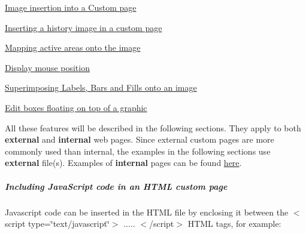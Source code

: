 \begin{DoxyItemize}
\item \hyperlink{RC_mhttpd_Image_access_RC_mhttpd_custom_image}{Image insertion into a Custom page}
\begin{DoxyItemize}
\item \hyperlink{RC_mhttpd_Image_access_RC_mhttpd_custom_history}{Inserting a history image in a custom page}
\item \hyperlink{RC_mhttpd_Image_access_RC_mhttpd_custom_imagemap}{Mapping active areas onto the image}
\begin{DoxyItemize}
\item \hyperlink{RC_mhttpd_Image_access_RC_mhttpd_custom_getmouse}{Display mouse position}
\end{DoxyItemize}
\item \hyperlink{RC_mhttpd_Image_access_RC_mhttpd_custom_Labels_Bars_Fills}{Superimposing Labels, Bars and Fills onto an image}
\item \hyperlink{RC_mhttpd_Image_access_RC_mhttpd_custom_edit_boxes}{Edit boxes floating on top of a graphic}
\end{DoxyItemize}
\end{DoxyItemize}

\par
 All these features will be described in the following sections. They apply to both {\bfseries external} and {\bfseries internal} web pages. \label{RC_mhttpd_custom_features_idx_mhttpd_page_custom_external}
\hypertarget{RC_mhttpd_custom_features_idx_mhttpd_page_custom_external}{}
 \label{RC_mhttpd_custom_features_mhttpd_custom_external}
\hypertarget{RC_mhttpd_custom_features_mhttpd_custom_external}{}
 Since external custom pages are more commonly used than internal, the examples in the following sections use {\bfseries external} file(s). Examples of {\bfseries internal} pages can be found \hyperlink{RC_mhttpd_Internal}{here}.

\par
 

\par
 \hypertarget{RC_mhttpd_custom_features_RC_mhttpd_custom_including_js}{}\subparagraph{Including JavaScript code in an HTML custom page}\label{RC_mhttpd_custom_features_RC_mhttpd_custom_including_js}
Javascript code can be inserted in the HTML file by enclosing it between the $<$script type=\char`\"{}text/javascript\char`\"{}$>$ ..... $<$/script$>$ HTML tags, for example: \par
 
